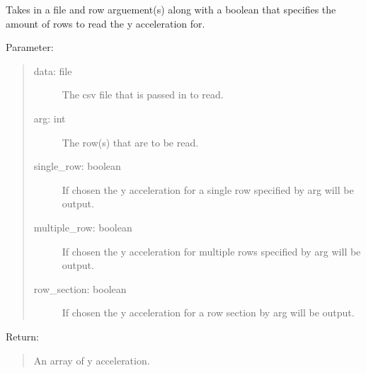 \documentclass[letterpaper,10pt,english]{sphinxmanual}
\begin{document}
\begin{fulllineitems}
\label{\detokenize{Lidar extraction tool:imu_extract.get_y_accel}}
Takes in a file and row arguement(s) along with a boolean that specifies the amount of rows to read the y acceleration for.

Parameter:
\begin{quote}
\begin{description}
\item[{data: file}] \leavevmode
The csv file that is passed in to read.

\item[{arg: int}] \leavevmode
The row(s) that are to be read.

\item[{single\_row: boolean}] \leavevmode
If chosen the y acceleration for a single row specified by arg will be output.

\item[{multiple\_row: boolean}] \leavevmode
If chosen the y acceleration for multiple rows specified by arg will be output.

\item[{row\_section: boolean}] \leavevmode
If chosen the y acceleration for a row section by arg will be output.

\end{description}
\end{quote}

Return:
\begin{quote}

An array of y acceleration.
\end{quote}

\end{fulllineitems}

\end{document}
